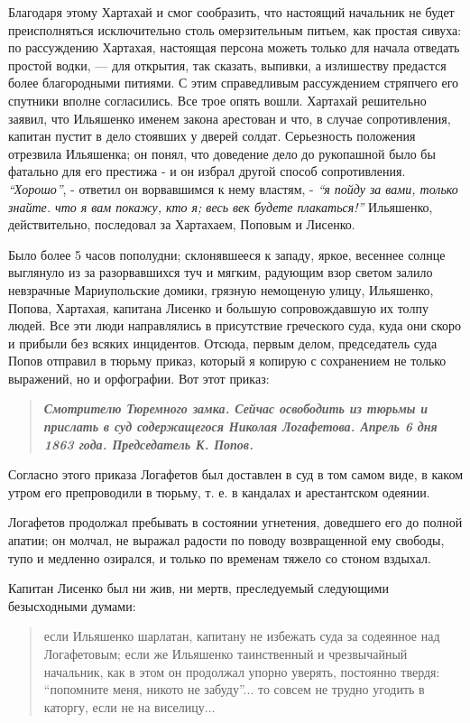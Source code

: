 \documentclass[a4paper,20pt]{report}
\begin{document}
Благодаря этому Хартахай и смог сообразить, что настоящий начальник не будет
преисполняться исключительно столь омерзительным питьем, как простая сивуха: по
рассуждению Хартахая, настоящая персона можеть только для начала отведать
простой водки, — для открытия, так сказать, выпивки, а излишеству предастся
более благородными питиями. С этим справедливым рассуждением стряпчего его
спутники вполне согласились. Все трое опять вошли. Хартахай решительно заявил,
что Ильяшенко именем закона арестован и что, в случае сопротивления, капитан
пустит в дело стоявших у дверей солдат.  Серьезность положения отрезвила
Ильяшенка; он понял, что доведение дело до рукопашной было бы фатально для его
престижа - и он избрал другой способ сопротивления. \emph{``Хорошо''}, -
ответил он ворвавшимся к нему властям, - \emph{``я пойду за вами, только
знайте. что я вам покажу, кто я; весь век будете плакаться!''} Ильяшенко,
действительно, последовал за Хартахаем, Поповым и Лисенко.

Было более 5 часов пополудни; склонявшееся к западу, яркое, 
весеннее солнце выглянуло из за разорвавшихся туч и мягким, радующим взор светом залило
невзрачные Мариупольские домики, грязную немощеную улицу,
Ильяшенко, Попова, Хартахая, капитана Лисенко и большую
сопровождавшую их толпу людей. Все эти люди направлялись в присутствие греческого суда, 
куда они скоро и прибыли без всяких инцидентов. Отсюда, первым делом, председатель суда Попов
отправил в тюрьму приказ, который я копирую с сохранением не только выражений, но и орфографии. Вот этот приказ:

\begin{quote}
\em\bfseries
Смотрителю Тюремного замка. Сейчас освободить из тюрьмы и 
прислать в суд содержащегося Николая Логафетова. Апрель
6 дня 1863 года. Председатель К. Попов.
\end{quote}

Согласно этого приказа Логафетов был доставлен в суд в том самом виде, в каком
утром его препроводили в тюрьму, т. е. в кандалах и арестантском одеянии.

Логафетов продолжал пребывать в состоянии угнетения, доведшего его до полной
апатии; он молчал, не выражал радости по поводу возвращенной ему свободы, тупо
и медленно озирался, и только по временам тяжело со стоном вздыхал.

Капитан Лисенко был ни жив, ни мертв, преследуемый следующими безысходными думами:

\begin{quote}
\em\bfseries
	
если Ильяшенко шарлатан, капитану не избежать суда за содеянное над
Логафетовым; если же Ильяшенко таинственный и чрезвычайный начальник,
как в этом он продолжал упорно уверять, постоянно твердя: ``попомните
меня, никото не забуду''... то совсем не трудно угодить в каторгу, если
не на виселицу...

\end{quote}
\end{document}
